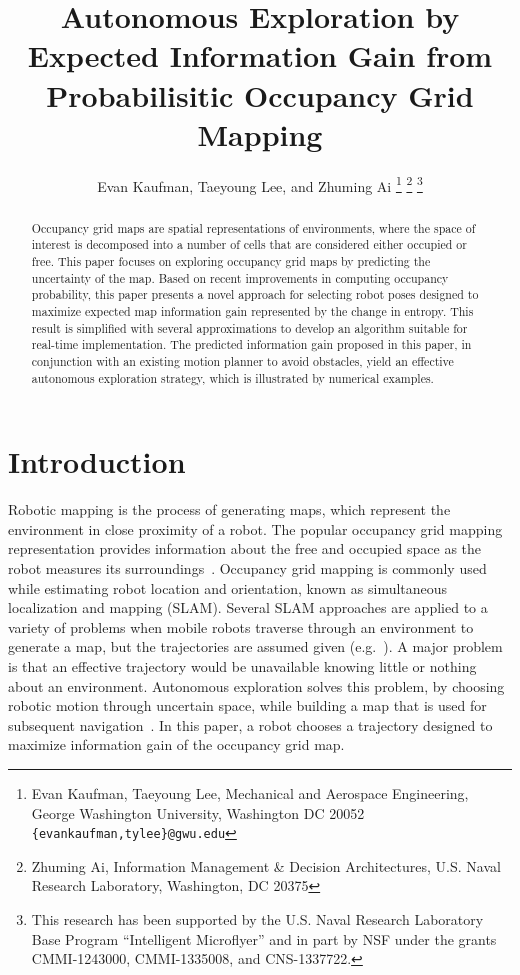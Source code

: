 \documentclass[letterpaper, 10pt]{ieeeconf}
\title{\LARGE \bf
Autonomous Exploration by Expected Information Gain from Probabilisitic Occupancy Grid Mapping
}
\author{Evan Kaufman, Taeyoung Lee, and Zhuming Ai%
\thanks{Evan Kaufman, Taeyoung Lee, Mechanical and Aerospace Engineering, George Washington University, Washington DC 20052 {\tt \{evankaufman,tylee\}@gwu.edu}}
\thanks{Zhuming Ai, Information Management \& Decision Architectures, U.S. Naval Research Laboratory,  Washington, DC 20375}
\thanks{This research has been supported by the U.S. Naval Research Laboratory Base Program ``Intelligent Microflyer'' and in part by NSF under the grants CMMI-1243000, CMMI-1335008, and CNS-1337722.}
}
\begin{document}
\maketitle
\thispagestyle{empty}
\pagestyle{empty}


\begin{abstract}
Occupancy grid maps are spatial representations of environments, where the space of interest is decomposed into a number of cells that are considered either occupied or free. This paper focuses on exploring occupancy grid maps by predicting the uncertainty of the map. Based on recent improvements in computing occupancy probability, this paper presents a novel approach for selecting robot poses designed to maximize expected map information gain represented by the change in entropy. This result is simplified with several approximations to develop an algorithm suitable for real-time implementation. The predicted information gain proposed in this paper, in conjunction with an existing motion planner to avoid obstacles, yield an effective autonomous exploration strategy, which is illustrated by numerical examples. 
\end{abstract}


\section{Introduction}

Robotic mapping is the process of generating maps, which represent the environment in close proximity of a robot. The popular occupancy grid mapping representation provides information about the free and occupied space as the robot measures its surroundings~\cite{ThrBurFox05}. Occupancy grid mapping is commonly used while estimating robot location and orientation, known as simultaneous localization and mapping (SLAM). Several SLAM approaches are applied to a variety of problems when mobile robots traverse through an environment to generate a map, but the trajectories are assumed given (e.g.~\cite{ThrBurFox05,DurBai06,CheChe09}). A major problem is that an effective trajectory would be unavailable knowing little or nothing about an environment. 
Autonomous exploration solves this problem, by choosing robotic motion through uncertain space, while building a map that is used for subsequent navigation~\cite{Yam97}.
In this paper, a robot chooses a trajectory designed to maximize information gain of the occupancy grid map.
\end{document}
